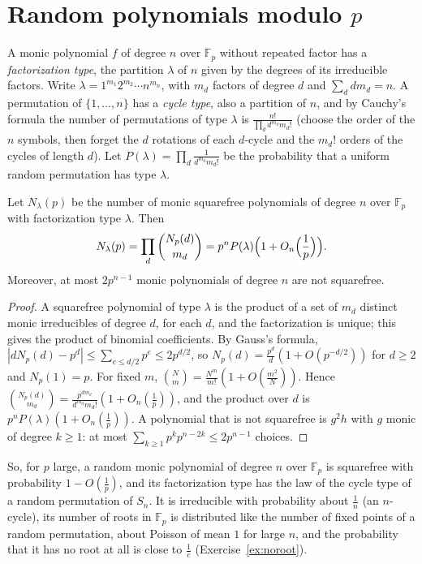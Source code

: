 \section{Random polynomials modulo $p$}

A monic polynomial $f$ of degree $n$ over $\mathbb F_p$ without repeated factor has a \emph{factorization type}, the partition $\lambda$ of $n$ given by the degrees of its irreducible factors. Write $\lambda=1^{m_1}2^{m_2}\cdots n^{m_n}$, with $m_d$ factors of degree $d$ and $\sum_ddm_d=n$. A permutation of $\{1,\dots,n\}$ has a \emph{cycle type}, also a partition of $n$, and by Cauchy's formula the number of permutations of type $\lambda$ is $\frac{n!}{\prod_dd^{m_d}m_d!}$ (choose the order of the $n$ symbols, then forget the $d$ rotations of each $d$-cycle and the $m_d!$ orders of the cycles of length $d$). Let $P(\lambda)=\prod_d\frac1{d^{m_d}m_d!}$ be the probability that a uniform random permutation has type $\lambda$.

\begin{theorem}\label{thm:factortypes}
Let $N_\lambda(p)$ be the number of monic squarefree polynomials of degree $n$ over $\mathbb F_p$ with factorization type $\lambda$. Then
\[
N_\lambda(p)=\prod_d\binom{N_p(d)}{m_d}=p^nP(\lambda)\Bigl(1+O_n\Bigl(\frac1p\Bigr)\Bigr).
\]
Moreover, at most $2p^{n-1}$ monic polynomials of degree $n$ are not squarefree.
\end{theorem}
\begin{proof}
A squarefree polynomial of type $\lambda$ is the product of a set of $m_d$ distinct monic irreducibles of degree $d$, for each $d$, and the factorization is unique; this gives the product of binomial coefficients. By Gauss's formula, $|dN_p(d)-p^d|\le\sum_{e\le d/2}p^e\le2p^{d/2}$, so $N_p(d)=\frac{p^d}d(1+O(p^{-d/2}))$ for $d\ge2$ and $N_p(1)=p$. For fixed $m$, $\binom Nm=\frac{N^m}{m!}(1+O(\frac{m^2}N))$. Hence $\binom{N_p(d)}{m_d}=\frac{p^{dm_d}}{d^{m_d}m_d!}(1+O_n(\frac1p))$, and the product over $d$ is $p^nP(\lambda)(1+O_n(\frac1p))$. A polynomial that is not squarefree is $g^2h$ with $g$ monic of degree $k\ge1$: at most $\sum_{k\ge1}p^kp^{n-2k}\le2p^{n-1}$ choices.
\end{proof}

So, for $p$ large, a random monic polynomial of degree $n$ over $\mathbb F_p$ is squarefree with probability $1-O(\frac1p)$, and its factorization type has the law of the cycle type of a random permutation of $S_n$. It is irreducible with probability about $\frac1n$ (an $n$-cycle), its number of roots in $\mathbb F_p$ is distributed like the number of fixed points of a random permutation, about Poisson of mean $1$ for large $n$, and the probability that it has no root at all is close to $\frac1e$ (Exercise~\ref{ex:noroot}).

